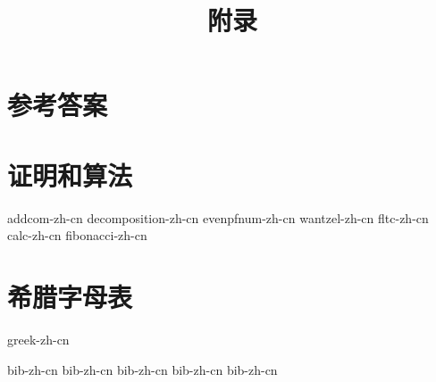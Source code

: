 \documentclass[b5paper]{ctexart}
\begin{document}
\title{附录}

\maketitle
\fi

\chapter{参考答案}
\label{ch:answers}
\shipoutAnswer

\chapter{证明和算法}

{addcom-zh-cn}
{decomposition-zh-cn}
{evenpfnum-zh-cn}
{wantzel-zh-cn}
{fltc-zh-cn}
{calc-zh-cn}
{fibonacci-zh-cn}

\chapter{希腊字母表} \label{ch:greek-letters}
{greek-zh-cn}

\markboth{\bibname}{}

\begin{thebibliography}{99}
  {bib-zh-cn}
  {bib-zh-cn}
  {bib-zh-cn}
  {bib-zh-cn}
  {bib-zh-cn}
\end{thebibliography}

\ifx\wholebook\relax \else
\expandafter\enddocument
\fi
\end{document}
